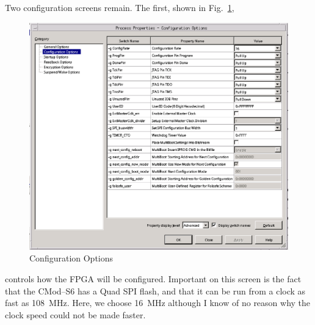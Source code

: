 \documentclass{gqtekspec}
\begin{document}
Two configuration screens remain.  The first, shown in
Fig.~\ref{fig:configopts},
\begin{figure}
\begin{center}
\includegraphics[width=6in]{../gfx/configopts.eps}
\caption{Configuration Options}\label{fig:configopts}
\end{center}\end{figure}
controls how the FPGA will be configured.  Important on this screen is the
fact that the CMod--S6 has a Quad SPI flash, and that it can be run from a
clock as fast as 108~MHz.  Here, we choose 16~MHz although I know of no reason
why the clock speed could not be made faster.
\end{document}
